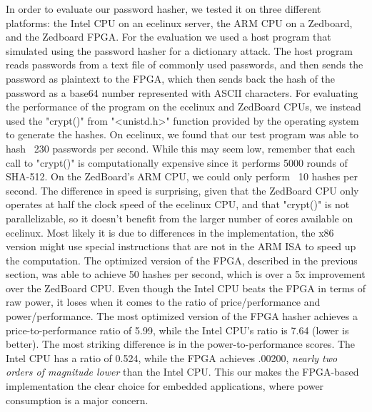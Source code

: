 In order to evaluate our password hasher, we tested it on three different platforms: the Intel CPU on an
ecelinux server, the ARM CPU on a Zedboard, and the Zedboard FPGA. For the evaluation we used a host program
that simulated using the password hasher for a dictionary attack. The host program reads passwords from
a text file of commonly used passwords, and then sends the password as plaintext to the FPGA, which
then sends back the hash of the password as a base64 number represented with ASCII characters. For
evaluating the performance of the program on the ecelinux and ZedBoard CPUs, we instead used the 
"crypt()" from "<unistd.h>" function provided by the operating system to generate the hashes. On
ecelinux, we found that our test program was able to hash ~230 passwords per second. While this may seem
low, remember that each call to "crypt()" is computationally expensive since it performs 5000 rounds of
SHA-512. On the ZedBoard's ARM CPU, we could only perform ~10 hashes per second. The difference in speed
is surprising, given that the ZedBoard CPU only operates at half the clock speed of the ecelinux CPU, and
that "crypt()" is not parallelizable, so it doesn't benefit from the larger number of cores available on
ecelinux. Most likely it is due to differences in the implementation, the x86 version might use special
instructions that are not in the ARM ISA to speed up the computation. The optimized version of the FPGA,
described in the previous section, was able to achieve 50 hashes per second, which is over a 5x
improvement over the ZedBoard CPU. Even though the Intel CPU beats the FPGA in terms of raw
power, it loses when it comes to the ratio of price/performance and power/performance. The most optimized
version of the FPGA hasher achieves a price-to-performance ratio of 5.99, while the Intel CPU's ratio is
7.64 (lower is better). The most striking difference is in the power-to-performance scores. The Intel CPU
has a ratio of 0.524, while the FPGA achieves .00200, \emph{nearly two orders of magnitude lower} than the
Intel CPU. This our makes the FPGA-based implementation the clear choice for embedded applications, where
power consumption is a major concern.
